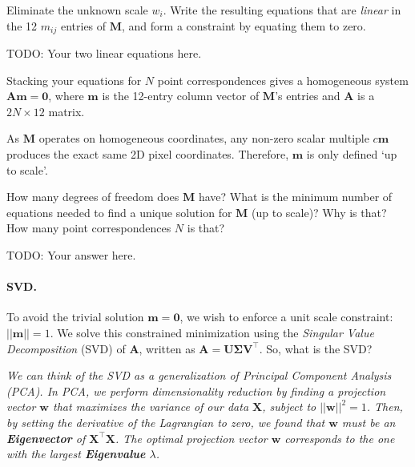 \documentclass{csci1430}
\begin{document}
\begin{subquestion}[points=2]
Eliminate the unknown scale $w_i$. Write the resulting equations that are \emph{linear} in the 12 $m_{ij}$ entries of $\mathbf{M}$, and form a constraint by equating them to zero.
\end{subquestion}

\begin{answer}[height=14]
TODO: Your two linear equations here.
\end{answer}

\pagebreak


\begin{subquestion}[points=2,drawbox=false]
Stacking your equations for $N$ point correspondences gives a homogeneous system $\mathbf{A}\mathbf{m} = \mathbf{0}$, where $\mathbf{m}$ is the 12-entry column vector of $\mathbf{M}$'s entries and $\mathbf{A}$ is a $2N \times 12$ matrix.

As $\mathbf{M}$ operates on homogeneous coordinates, any non-zero scalar multiple $c\mathbf{m}$ produces the exact same 2D pixel coordinates. Therefore, $\mathbf{m}$ is only defined `up to scale'.

\begin{orangebox}
How many degrees of freedom does $\mathbf{M}$ have?
What is the minimum number of equations needed to find a unique solution for $\mathbf{M}$ (up to scale)?
Why is that?
How many point correspondences $N$ is that?
\end{orangebox}
\end{subquestion}

\begin{answer}[height=8]
TODO: Your answer here.
\end{answer}

\pagebreak

\paragraph{SVD.}
To avoid the trivial solution $\mathbf{m} = \mathbf{0}$, we wish to enforce a unit scale constraint: $||\mathbf{m}|| = 1$. We solve this constrained minimization using the \emph{Singular Value Decomposition} (SVD) of $\mathbf{A}$, written as $\mathbf{A} = \mathbf{U}\boldsymbol{\Sigma}\mathbf{V}^\top$. So, what is the SVD?

\textit{We can think of the SVD as a generalization of Principal Component Analysis (PCA). In PCA, we perform dimensionality reduction by finding a projection vector $\mathbf{w}$ that maximizes the variance of our data $\mathbf{X}$, subject to $||\mathbf{w}||^2=1$. Then, by setting the derivative of the Lagrangian to zero, we found that $\mathbf{w}$ must be an \textbf{Eigenvector} of $\mathbf{X}^\top\mathbf{X}$. The optimal projection vector $\mathbf{w}$ corresponds to the one with the largest \textbf{Eigenvalue} $\lambda$.}
\end{document}
